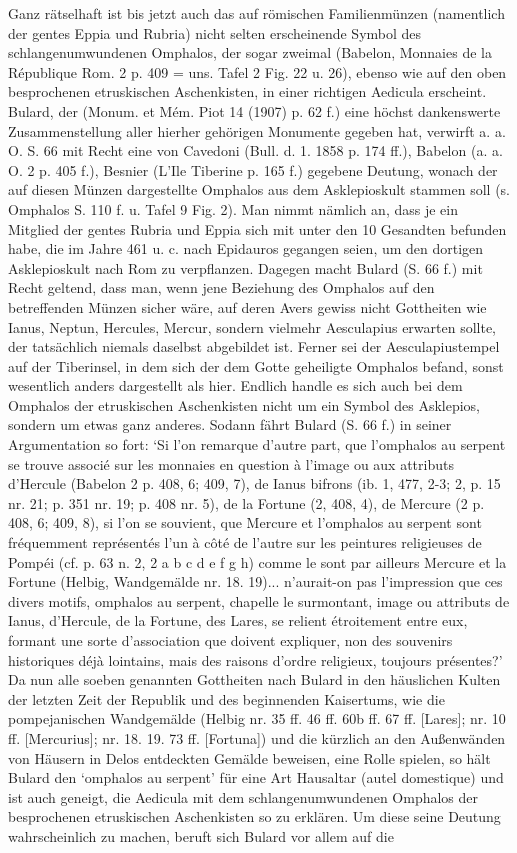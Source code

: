 \documentclass[a4paper, 11pt, oneside]{article}
\begin{document}
Ganz rätselhaft ist bis jetzt auch das auf römischen Familienmünzen (namentlich der gentes Eppia und Rubria) nicht selten erscheinende Symbol des schlangenumwundenen Omphalos, der sogar zweimal (Babelon, Monnaies de la République Rom. 2 p. 409 = uns. Tafel 2 Fig. 22 u. 26), ebenso wie auf den oben besprochenen etruskischen Aschenkisten, in einer richtigen Aedicula erscheint. Bulard, der (Monum. et Mém. Piot 14 (1907) p. 62 f.) eine höchst dankenswerte Zusammenstellung aller hierher gehörigen Monumente gegeben hat, verwirft a. a. O. S. 66 mit Recht eine von Cavedoni (Bull. d. 1. 1858 p. 174 ff.), Babelon (a. a. O. 2 p. 405 f.), Besnier (L'Ile Tiberine p. 165 f.) gegebene Deutung, wonach der auf diesen Münzen dargestellte Omphalos aus dem Asklepioskult stammen soll (s. Omphalos S. 110 f. u. Tafel 9 Fig. 2). Man nimmt nämlich an, dass je ein Mitglied der gentes Rubria und Eppia sich mit unter den 10 Gesandten befunden habe, die im Jahre 461 u. c. nach Epidauros gegangen seien, um den dortigen Asklepioskult nach Rom zu verpflanzen. Dagegen macht Bulard (S. 66 f.) mit Recht geltend, dass man, wenn jene Beziehung des Omphalos auf den betreffenden Münzen sicher wäre, auf deren Avers gewiss nicht Gottheiten wie Ianus, Neptun, Hercules, Mercur, sondern vielmehr Aesculapius erwarten sollte, der tatsächlich niemals daselbst abgebildet ist. Ferner sei der Aesculapiustempel auf der Tiberinsel, in dem sich der dem Gotte geheiligte Omphalos befand, sonst wesentlich anders dargestellt als hier. Endlich handle es sich auch bei dem Omphalos der etruskischen Aschenkisten nicht um ein Symbol des Asklepios, sondern um etwas ganz anderes. Sodann fährt Bulard (S. 66 f.) in seiner Argumentation so fort: `Si l'on remarque d'autre part, que l'omphalos au serpent se trouve associé sur les monnaies en question à l'image ou aux attributs d'Hercule (Babelon 2 p. 408, 6; 409, 7), de Ianus bifrons (ib. 1, 477, 2-3; 2, p. 15 nr. 21; p. 351 nr. 19; p. 408 nr. 5), de la Fortune (2, 408, 4), de Mercure (2 p. 408, 6; 409, 8), si l'on se souvient, que Mercure et l'omphalos au serpent sont fréquemment représentés l'un à côté de l'autre sur les peintures religieuses de Pompéi (cf. p. 63 n. 2, 2 a b c d e f g h) comme le sont par ailleurs Mercure et la Fortune (Helbig, Wandgemälde nr. 18. 19)... n'aurait-on pas l'impression que ces divers motifs, omphalos au serpent, chapelle le surmontant, image ou attributs de Ianus, d'Hercule, de la Fortune, des Lares, se relient étroitement entre eux, formant une sorte d'association que doivent expliquer, non des souvenirs historiques déjà lointains, mais des raisons d'ordre religieux, toujours présentes?' Da nun alle soeben genannten Gottheiten nach Bulard in den häuslichen Kulten der letzten Zeit der Republik und des beginnenden Kaisertums, wie die pompejanischen Wandgemälde (Helbig nr. 35 ff. 46 ff. 60b ff. 67 ff. [Lares]; nr. 10 ff. [Mercurius]; nr. 18. 19. 73 ff. [Fortuna]) und die kürzlich an den Außenwänden von Häusern in Delos entdeckten Gemälde beweisen, eine Rolle spielen, so hält Bulard den `omphalos au serpent' für eine Art Hausaltar (autel domestique) und ist auch geneigt, die Aedicula mit dem schlangenumwundenen Omphalos der besprochenen etruskischen Aschenkisten so zu erklären. Um diese seine Deutung wahrscheinlich zu machen, beruft sich Bulard vor allem auf die 
\end{document}
